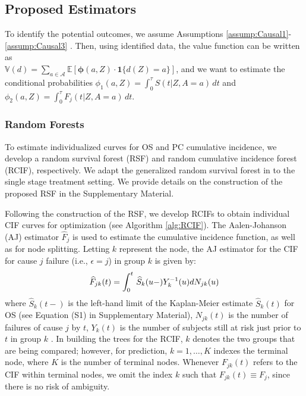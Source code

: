

\subsection{Proposed Estimators}
\label{sec:proposedmethod}

To identify the potential outcomes, we assume Assumptions \ref{assump:Causal1}-\ref{assump:Causal3} \citep{kidwell2016, kosorok_precision_2019}. Then, using identified data, the value function can be written as \\
$\mathbb{V}(d) = 
    \sum_{a \in \mathcal{A}} \mathbb{E}\left[ 
    \boldsymbol{\phi}(a,Z)
\cdot \mathbf{1}\{d(Z) = a\}
\right]$, and we want to estimate the conditional probabilities $\phi_1(a,Z) = \int_0^\tau S(t|Z,A=a) \, dt$ and $\phi_2(a,Z) = \int_0^\tau F_j(t|Z,A=a)\,dt$.



\subsubsection{Random Forests}
To estimate individualized curves for OS and PC cumulative incidence, we develop a random survival forest (RSF) and random cumulative incidence forest (RCIF), respectively. We adapt the generalized random survival forest in \cite{cho_multi-stage_2023} to the single stage treatment setting. We provide details on the construction of the proposed RSF in the Supplementary Material.

Following the construction of the RSF, we develop RCIFs to obtain individual CIF curves for optimization (see Algorithm \ref{alg:RCIF}). The Aalen-Johanson (AJ) estimator $\widehat{F}_j$ is used to estimate the cumulative incidence function, as well as for node splitting.
Letting $k$ represent the node, the AJ estimator for the CIF for cause $j$ failure (i.e., $\epsilon = j$) in group $k$ is given by:
\begin{equation}
\label{AJ_estimator}
   \widehat{F}_{jk}(t) = \int_0^t\,\widehat{S}_k(u-)Y_k^{-1}(u)dN_{jk}(u) 
\end{equation} where $\widehat{S}_k(t-)$ is the left-hand limit of the Kaplan-Meier estimate $\widehat{S}_k(t)$ for OS (see Equation (S1) in Supplementary Material), $N_{jk}(t)$ is the number of failures of cause $j$ by $t$, $Y_k(t)$ is the number of subjects still at risk just prior to $t$ in group $k$ \citep{gray1988}. In building the trees for the RCIF, $k$ denotes the two groups that are being compared; however, for prediction, $k = 1, \dots, K$ indexes the terminal node, where $K$ is the number of terminal nodes. Whenever $F_{jk}(t)$ refers to the CIF within terminal nodes, we omit the index $k$ such that $F_{jk}(t) \equiv F_j$, since there is no risk of ambiguity. 

